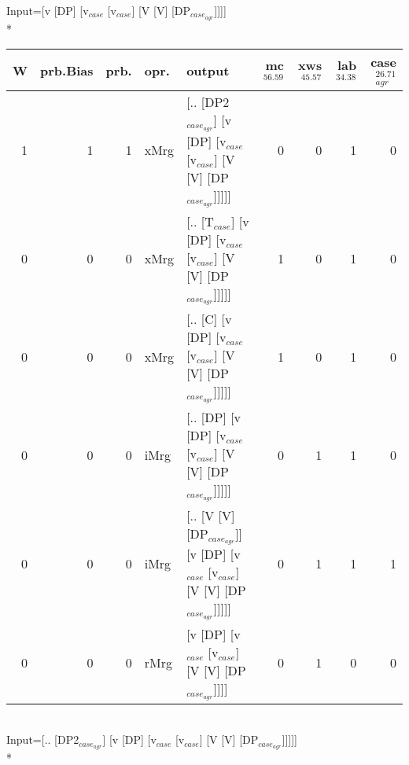 \begingroup\scriptsize Input=[v [DP] [v$_{case}$ [v$_{case}$] [V [V] [DP$_{case_{agr}}$]]]]\\*
\begin{tabularx}{\linewidth}{rrrlXrrrr}
\hline
   W &   prb.Bias &   prb. & opr.   & output                                                                      &   mc$^{56.59}$ &   xws$^{45.57}$ &   lab$^{34.38}$ &   case$_{agr}^{26.71}$ \\
\hline
   1 &       1 &   1 & xMrg & [.. [DP2$_{case_{agr}}$] [v [DP] [v$_{case}$ [v$_{case}$] [V [V] [DP$_{case_{agr}}$]]]]]        &            0 &             0 &             1 &                  0 \\
   0 &       0 &   0 & xMrg & [.. [T$_{case}$] [v [DP] [v$_{case}$ [v$_{case}$] [V [V] [DP$_{case_{agr}}$]]]]]              &            1 &             0 &             1 &                  0 \\
   0 &       0 &   0 & xMrg & [.. [C] [v [DP] [v$_{case}$ [v$_{case}$] [V [V] [DP$_{case_{agr}}$]]]]]                   &            1 &             0 &             1 &                  0 \\
   0 &       0 &   0 & iMrg & [.. [DP] [v [DP] [v$_{case}$ [v$_{case}$] [V [V] [DP$_{case_{agr}}$]]]]]                  &            0 &             1 &             1 &                  0 \\
   0 &       0 &   0 & iMrg & [.. [V [V] [DP$_{case_{agr}}$]] [v [DP] [v$_{case}$ [v$_{case}$] [V [V] [DP$_{case_{agr}}$]]]]] &            0 &             1 &             1 &                  1 \\
   0 &       0 &   0 & rMrg & [v [DP] [v$_{case}$ [v$_{case}$] [V [V] [DP$_{case_{agr}}$]]]]                            &            0 &             1 &             0 &                  0 \\
\hline
\end{tabularx}\endgroup\\
\begingroup\scriptsize Input=[.. [DP2$_{case_{agr}}$] [v [DP] [v$_{case}$ [v$_{case}$] [V [V] [DP$_{case_{agr}}$]]]]]\\*
